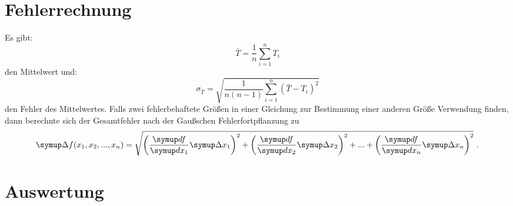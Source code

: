 \section{Fehlerrechnung}
Es gibt:
\begin{equation}
  \bar{T} = \frac{1}{n} \sum_{i=1}^{n} T_{i}
  \label{eqn:1}
\end{equation}
den Mittelwert und:
\begin{equation}
  \sigma_{\bar{T}} = \sqrt{\frac{1}{n(n-1)} \sum_{i=1}^{n}(\bar{T}-T_i)^2}
  \label{eqn:2}
\end{equation}
den Fehler des Mittelwertes. Falls zwei fehlerbehaftete Größen in einer Gleichung
zur Bestimmung einer anderen Größe Verwendung finden, dann berechnte sich der Gesamtfehler
nach der Gaußschen Fehlerfortpflanzung zu
\begin{equation}
    \symup \Delta f(x_1, x_2, ..., x_n) = \sqrt{\left(\frac{\symup df}{\symup dx_1} \symup \Delta
    x_1 \right)^2 +    \left(\frac{\symup df}{\symup dx_2} \symup \Delta
    x_2 \right)^2 + ... + \left(\frac{\symup df}{\symup dx_n} \symup \Delta x_n \right)^2} \ .
    \label{eqn:3}
\end{equation}

\section{Auswertung}
